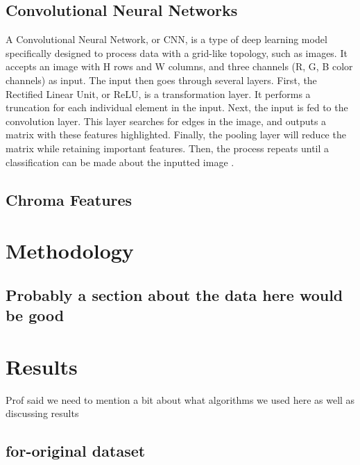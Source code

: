 \documentclass[conference]{IEEEtran}
\begin{document}
\subsection{Convolutional Neural Networks}
A Convolutional Neural Network, or CNN, is a type of deep learning model specifically designed to process data with a grid-like topology, such as images. It accepts an image with H rows and W columns, and three channels (R, G, B color channels) as input. The input then goes through several layers. First, the Rectified Linear Unit, or ReLU, is a transformation layer. It performs a truncation for each individual element in the input. Next, the input is fed to the convolution layer. This layer searches for edges in the image, and outputs a matrix with these features highlighted. Finally, the pooling layer will reduce the matrix while retaining important features. Then, the process repeats until a classification can be made about the inputted image \cite{wu2017introduction}.

\subsection{Chroma Features}

\section{Methodology}

\subsection{Probably a section about the data here would be good}

\section{Results}

Prof said we need to mention a bit about what algorithms we used here as well as discussing results

\subsection{for-original dataset}
\end{document}

